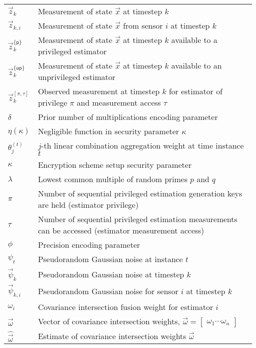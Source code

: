 \documentclass[oneside]{scrbook}
\theoremstyle{definition}
\theoremstyle{definition}
\theoremstyle{remark}
\begin{document}
\begin{longtable}{p{}p{}}
    $\vec{z}_k$ & Measurement of state $\vec{x}$ at timestep $k$\\
    $\vec{z}_{k,i}$ & Measurement of state $\vec{x}$ from sensor $i$ at timestep $k$\\
    $\vec{z}_k^{\{\mathsf{p}\}}$ & Measurement of state $\vec{x}$ at timestep $k$ available to a privileged estimator\\
    $\vec{z}_k^{\{\mathsf{up}\}}$ & Measurement of state $\vec{x}$ at timestep $k$ available to an unprivileged estimator\\
    $\vec{z}^{[\pi,\tau]}_k$ & Observed measurement at timestep $k$ for estimator of privilege $\pi$ and measurement access $\tau$\\
    $\delta$ & Prior number of multiplications encoding parameter\\
    $\eta(\kappa)$ & Negligible function in security parameter $\kappa$\\
    $\theta^{(t)}_j$ & $j$-th linear combination aggregation weight at time instance $t$\\
    $\kappa$ & Encryption scheme setup security parameter\\
    $\lambda$ & Lowest common multiple of random primes $p$ and $q$\\
    $\pi$ & Number of sequential privileged estimation generation keys are held (estimator privilege)\\
    $\tau$ & Number of sequential privileged estimation measurements can be accessed (estimator measurement access)\\
    $\phi$ & Precision encoding parameter\\
    $\psi_t$ & Pseudorandom Gaussian noise at instance $t$\\
    $\vec{\psi}_k$ & Pseudorandom Gaussian noise at timestep $k$\\
    $\vec{\psi}_{k,i}$ & Pseudorandom Gaussian noise for sensor $i$ at timestep $k$\\
    $\omega_i$ & Covariance intersection fusion weight for estimator $i$\\
    $\vec{\omega}$ & Vector of covariance intersection weights, $\vec{\omega}=\begin{bmatrix}\omega_1\cdots\omega_n\end{bmatrix}$\\
    $\hat{\vec{\omega}}$ & Estimate of covariance intersection weights $\vec{\omega}$
\end{longtable}
\end{document}
